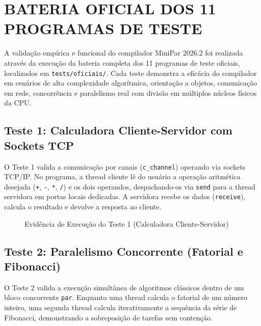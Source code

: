 \chapter{BATERIA OFICIAL DOS 11 PROGRAMAS DE TESTE}

A validação empírica e funcional do compilador MiniPar 2026.2 foi realizada através da execução da bateria completa dos 11 programas de teste oficiais, localizados em \texttt{tests/oficiais/}. Cada teste demonstra a eficácia do compilador em cenários de alta complexidade algorítmica, orientação a objetos, comunicação em rede, concorrência e paralelismo real com divisão em múltiplos núcleos físicos da CPU.

\section{Teste 1: Calculadora Cliente-Servidor com Sockets TCP}
O Teste 1 valida a comunicação por canais (\texttt{c\_channel}) operando via sockets TCP/IP. No programa, a thread cliente lê do usuário a operação aritmética desejada (\texttt{+}, \texttt{-}, \texttt{*}, \texttt{/}) e os dois operandos, despachando-os via \texttt{send} para a thread servidora em portas locais dedicadas. A servidora recebe os dados (\texttt{receive}), calcula o resultado e devolve a resposta ao cliente.

\begin{figure}[htbp]
    \centering
    \caption{Evidência de Execução do Teste 1 (Calculadora Cliente-Servidor)}
    \label{fig:teste1_print}
\end{figure}

\section{Teste 2: Paralelismo Concorrente (Fatorial e Fibonacci)}
O Teste 2 valida a execução simultânea de algoritmos clássicos dentro de um bloco concorrente \texttt{par}. Enquanto uma thread calcula o fatorial de um número inteiro, uma segunda thread calcula iterativamente a sequência da série de Fibonacci, demonstrando a sobreposição de tarefas sem contenção.

